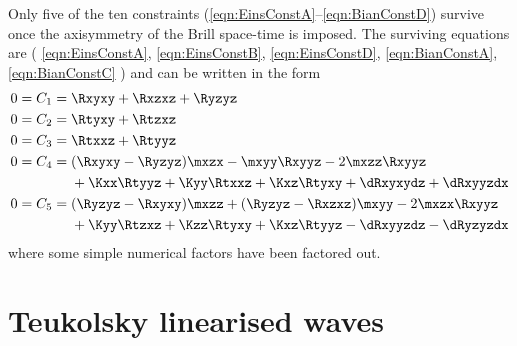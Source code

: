\documentclass[a4paper,12pt]{article}
\numberwithin{equation}{section}
\begin{document}
Only five of the ten constraints (\ref{eqn:EinsConstA}--\ref{eqn:BianConstD}) survive once
the axisymmetry of the Brill space-time is imposed. The surviving equations are
(%
\ref{eqn:EinsConstA},%
\ref{eqn:EinsConstB},%
\ref{eqn:EinsConstD},%
\ref{eqn:BianConstA},%
\ref{eqn:BianConstC}%
) and can be written in the form
\begin{align}
   \label{eqn:BrillConstC1}
   0 = C_1 ={} & \Rxyxy+\Rxzxz+\Ryzyz \\
   \label{eqn:BrillConstC2}
   0 = C_2 ={} & \Rtyxy+\Rtzxz\\
   \label{eqn:BrillConstC3}
   0 = C_3 ={} & \Rtxxz+\Rtyyz\\
   \label{eqn:BrillConstC4}
   0 = C_4 ={}
   &
   (\Rxyxy-\Ryzyz) \mxzx
   - \mxyy \Rxyyz
   -2 \mxzz \Rxyyz
   \notag\\
   &
   +\Kxx \Rtyyz
   +\Kyy \Rtxxz
   +\Kxz \Rtyxy
   +\dRxyxydz
   +\dRxyyzdx
   \\
   \label{eqn:BrillConstC5}
   0 = C_5 ={}
   &
   (\Ryzyz-\Rxyxy) \mxzz
   +(\Ryzyz-\Rxzxz) \mxyy
   -2 \mxzx\Rxyyz
   \notag\\
   &
   +\Kyy \Rtzxz
   +\Kzz \Rtyxy
   +\Kxz \Rtyyz
   -\dRxyyzdz
   -\dRyzyzdx
\end{align}
where some simple numerical factors have been factored out.

\section{Teukolsky linearised waves}
\label{sec:TeukolskyWaves}
\end{document}
